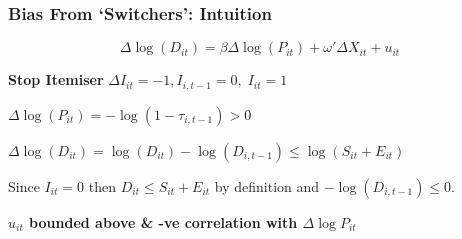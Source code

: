 \documentclass[options]{beamer}
\begin{document}
	


	\begin{frame}
		\frametitle{ Bias From `Switchers': Intuition}
		\begin{itemize}
		
			\item[]  \begin{equation*}\Delta \log(D_{it})=\beta \Delta\log(P_{it})+ \omega'\Delta X_{it}+ u_{it} \end{equation*}
		\vspace{1pt}

\item[] \textbf{ Stop Itemiser} $ \Delta I_{it}=-1, I_{i,t-1}=0, \;I_{it}=1$
\vspace{10pt}
\item   $\Delta \log (P_{it})=-\log(1-\tau_{i,t-1})>0$
\vspace{10pt}
\item  $\Delta \log (D_{it})=\log( D_{it})-\log (D_{i,t-1})\leq \log(S_{it}+E_{it})$
\vspace{5pt}
\item[]
\vspace{5pt}
\item[] Since $I_{it}=0$ then  $D_{it}\leq S_{it}+E_{it}$ by definition and $-\log (D_{i,t-1})\leq 0$.
\vspace{5pt}
\begin{center}
\item[] \textbf{ $u_{it}$  bounded above \&  -ve correlation with $\Delta \log P_{it}$}
\end{center}


	



\end{itemize}
\end{frame}
\end{document}
